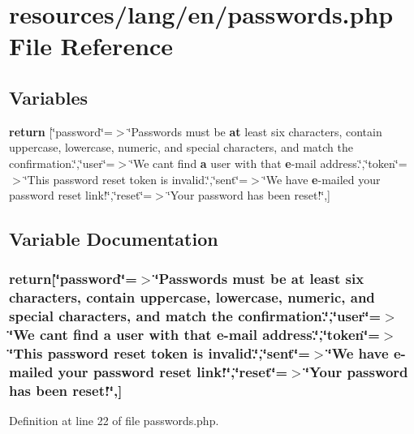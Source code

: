 \section{resources/lang/en/passwords.php File Reference}
\label{passwords_8php}
\subsection*{Variables}
\begin{DoxyCompactItemize}
\item 
{\bf return} [\char`\"{}password\char`\"{}=$>$\char`\"{}Passwords must be {\bf at} least six characters, contain uppercase, lowercase, numeric, and special characters, and match the confirmation.\char`\"{},\char`\"{}user\char`\"{}=$>$\char`\"{}We can\textquotesingle{}t find {\bf a} user with that {\bf e}-\/mail address.\char`\"{},\char`\"{}token\char`\"{}=$>$\char`\"{}This password reset token is invalid.\char`\"{},\char`\"{}sent\char`\"{}=$>$\char`\"{}We have {\bf e}-\/mailed your password reset link!\char`\"{},\char`\"{}reset\char`\"{}=$>$\char`\"{}Your password has been reset!\char`\"{},]
\end{DoxyCompactItemize}


\subsection{Variable Documentation}
\subsubsection[{return}]{\setlength{\rightskip}{0pt plus 5cm}return[\char`\"{}password\char`\"{}=$>$\char`\"{}Passwords must be {\bf at} least six characters, contain uppercase, lowercase, numeric, and special characters, and match the confirmation.\char`\"{},\char`\"{}user\char`\"{}=$>$\char`\"{}We can\textquotesingle{}t find {\bf a} user with that {\bf e}-\/mail address.\char`\"{},\char`\"{}token\char`\"{}=$>$\char`\"{}This password reset token is invalid.\char`\"{},\char`\"{}sent\char`\"{}=$>$\char`\"{}We have {\bf e}-\/mailed your password reset link!\char`\"{},\char`\"{}reset\char`\"{}=$>$\char`\"{}Your password has been reset!\char`\"{},]}\label{passwords_8php_af6e4ca01f8682fe8a4ef7312c700415e}


Definition at line 22 of file passwords.\+php.

